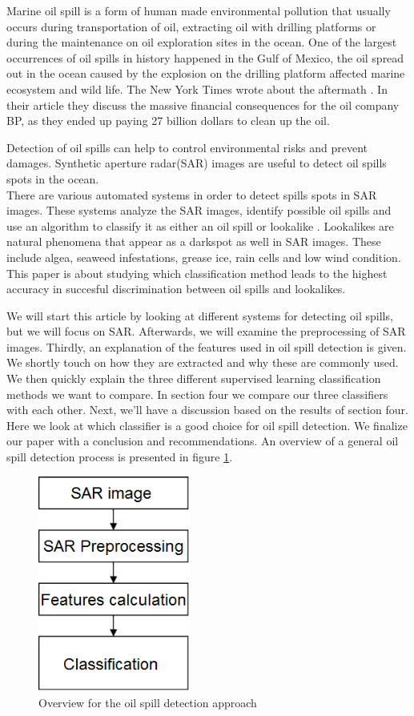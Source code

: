 Marine oil spill is a form of human made environmental pollution that usually occurs during transportation of oil, extracting oil with drilling platforms \cite{Zhang201476} or during the maintenance on oil exploration sites in the ocean. One of the largest occurrences of oil spills in history happened in the Gulf of Mexico, the oil spread out in the ocean caused by the explosion on the drilling platform affected marine ecosystem and wild life\cite{Bozeman2011244}. The New York Times wrote about the aftermath \cite{bpnytimes}. In their article they discuss the massive financial consequences for the oil company BP, as they ended up paying 27 billion dollars to clean up the oil.

Detection of oil spills can help to control environmental risks and prevent damages. Synthetic aperture radar(SAR) images are useful to detect oil spills spots in the ocean. \\
There are various automated systems in order to detect spills spots in SAR images. These systems analyze the SAR images, identify possible oil spills and use an algorithm to classify it as either an oil spill or lookalike \cite{Xu201414,brekke2008classifiers,Keramitsoglou2006640,Guo2014146}. Lookalikes are natural phenomena that appear as a darkspot as well in SAR images. These include algea, seaweed infestations, grease ice, rain cells and low wind condition. This paper is about studying which classification method leads to the highest accuracy in succesful discrimination between oil spills and lookalikes.

We will start this article by looking at different systems for detecting oil spills, but we will focus on SAR. Afterwards, we will examine the preprocessing of SAR images. Thirdly, an explanation of the features used in oil spill detection is given. We shortly touch on how they are extracted and why these are commonly used. We then quickly explain the three different supervised learning classification methods we want to compare. In section four we compare our three classifiers with each other. Next, we'll have a discussion based on the results of section four. Here we look at which classifier is a good choice for oil spill detection. We finalize our paper with a conclusion and recommendations. An overview of a general oil spill detection process is presented in figure \ref{fig:overview}.

\begin{figure}[H]
	\centering
    \includegraphics[width=50mm,scale=0.3]{./img/basicsteps.png}
    \caption{\footnotesize{Overview for the oil spill detection approach}}
    \label{fig:overview}
\end{figure}